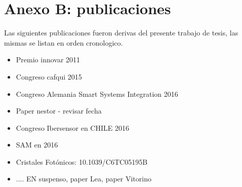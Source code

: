 \cleardoublepage{}
{}
\FormatoAnexo

\RemoveLabelsAxUno

\AddLabelsAxDos

\chapter*{Anexo B: publicaciones}

  \noindent Las siguientes publicaciones fueron derivas del presente trabajo de tesis, las mismas se listan en orden cronologico.

  \begin{itemize}
  	
  	\item Premio innovar 2011
    
    \item Congreso cafqui 2015
    
    \item Congreso Alemania Smart Systems Integration 2016
    
    \item Paper nestor - revisar fecha

    \item Congreso Ibersensor en CHILE 2016
    
    \item SAM en 2016

    \item Cristales Fotónicos:  10.1039/C6TC05195B
    
    \item .... EN suspenso, paper Lea, paper Vitorino

  \end{itemize}	

\thispagestyle{backmatter}
